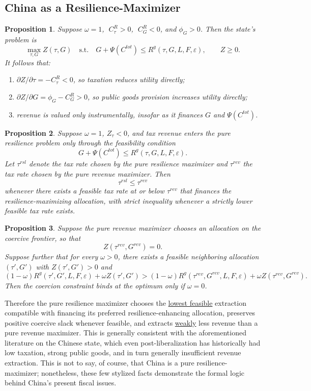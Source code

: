\documentclass[12pt]{article}
\newtheorem{proposition}{Proposition}
\begin{document}
\subsection{China as a Resilience-Maximizer}

\begin{proposition}
Suppose $\omega=1$, $\;C^R_\tau>0$, $\;C^R_G<0$, and $\phi_G>0$. Then the state's problem is
\[
\max_{\tau,G} Z(\tau,G)
\quad \text{s.t.} \quad
G+\Psi(C^{tot}) \le R^g(\tau,G,L,F,\varepsilon), \qquad Z\ge 0.
\]
It follows that:
\begin{enumerate}
    \item $\partial Z/\partial \tau = -C^R_\tau <0$, so taxation reduces utility directly;
    \item $\partial Z/\partial G = \phi_G - C^R_G >0$, so public goods provision increases utility directly;
    \item revenue is valued only instrumentally, insofar as it finances $G$ and $\Psi(C^{tot})$.
\end{enumerate}\label{proposition: comparativestats}
\end{proposition}

\begin{proposition}\label{prop:tauranking}
Suppose $\omega=1$, $Z_\tau<0$, and tax revenue enters the pure resilience problem only through the feasibility condition
\[
G+\Psi(C^{tot}) \le R^g(\tau,G,L,F,\varepsilon).
\]
Let $\tau^{rsl}$ denote the tax rate chosen by the pure resilience maximizer and $\tau^{rev}$ the tax rate chosen by the pure revenue maximizer. Then
\[
\tau^{rsl} \le \tau^{rev}
\]
whenever there exists a feasible tax rate at or below $\tau^{rev}$ that finances the resilience-maximizing allocation, with strict inequality whenever a strictly lower feasible tax rate exists.
\end{proposition}

\begin{proposition}\label{prop:bindsonlyomega0}
Suppose the pure revenue maximizer chooses an allocation on the coercive frontier, so that
\[
Z(\tau^{rev},G^{rev})=0.
\]
Suppose further that for every $\omega>0$, there exists a feasible neighboring allocation $(\tau',G')$ with $Z(\tau',G')>0$ and
\[
(1-\omega)R^g(\tau',G',L,F,\varepsilon)+\omega Z(\tau',G')
>
(1-\omega)R^g(\tau^{rev},G^{rev},L,F,\varepsilon)+\omega Z(\tau^{rev},G^{rev}).
\]
Then the coercion constraint binds at the optimum only if $\omega=0$.
\end{proposition}

Therefore the pure resilience maximizer chooses the \underline{lowest feasible} extraction compatible with financing its preferred resilience-enhancing allocation, preserves positive coercive slack whenever feasible, and extracts \underline{weakly} less revenue than a pure revenue maximizer. This is generally consistent with the aforementioned literature on the Chinese state, which even post-liberalization has historically had low taxation, strong public goods, and in turn generally insufficient revenue extraction. This is not to say, of course, that China is a pure resilience-maximizer; nonetheless, these few stylized facts demonstrate the formal logic behind China's present fiscal issues.
\end{document}
